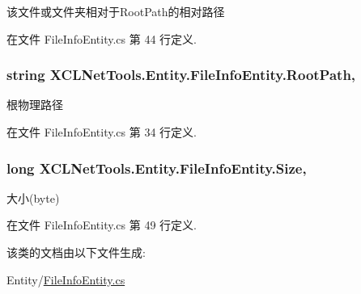 该文件或文件夹相对于\-Root\-Path的相对路径 



在文件 File\-Info\-Entity.\-cs 第 44 行定义.

\hypertarget{class_x_c_l_net_tools_1_1_entity_1_1_file_info_entity_a6ef4c659747c605379a43168ae1d64f6}{
\subsubsection[{Root\-Path}]{\setlength{\rightskip}{0pt plus 5cm}string X\-C\-L\-Net\-Tools.\-Entity.\-File\-Info\-Entity.\-Root\-Path\hspace{0.3cm}{\ttfamily [get]}, {\ttfamily [set]}}}\label{class_x_c_l_net_tools_1_1_entity_1_1_file_info_entity_a6ef4c659747c605379a43168ae1d64f6}


根物理路径 



在文件 File\-Info\-Entity.\-cs 第 34 行定义.

\hypertarget{class_x_c_l_net_tools_1_1_entity_1_1_file_info_entity_a7447a43994e75793388e160a626ba346}{
\subsubsection[{Size}]{\setlength{\rightskip}{0pt plus 5cm}long X\-C\-L\-Net\-Tools.\-Entity.\-File\-Info\-Entity.\-Size\hspace{0.3cm}{\ttfamily [get]}, {\ttfamily [set]}}}\label{class_x_c_l_net_tools_1_1_entity_1_1_file_info_entity_a7447a43994e75793388e160a626ba346}


大小(byte) 



在文件 File\-Info\-Entity.\-cs 第 49 行定义.



该类的文档由以下文件生成\-:\begin{DoxyCompactItemize}
\item 
Entity/\hyperlink{_file_info_entity_8cs}{File\-Info\-Entity.\-cs}\end{DoxyCompactItemize}
